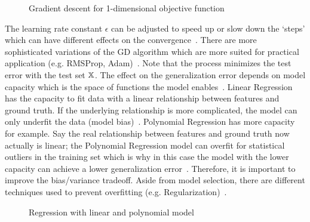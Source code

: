\begin{figure}
    \centering
    
    \caption{Gradient descent for 1-dimensional objective
        function~\citep{goodfellow_deep_2016}\label{fig:grad-desc}}
\end{figure}
The learning rate constant $\epsilon$ can be adjusted to speed up or slow down the `steps' which
can have different effects on the convergence~\citep{goodfellow_deep_2016}.
There are more sophisticated variations of the \ac{GD} algorithm which are more suited for practical
application (e.g. RMSProp, Adam)~\citep{geron_hands-machine_2017}.
Note that the process minimizes the test error with the test set $\mathbb{X}$.
The effect on the generalization error depends on model capacity which is the space of functions
the model enables~\citep{goodfellow_deep_2016}.
Linear Regression has the capacity to fit data with a linear relationship between features and
ground truth.
If the underlying relationship is more complicated, the model can only underfit the data (model
bias)~\citep{goodfellow_deep_2016}.
Polynomial Regression has more capacity for example.
Say the real relationship between features and ground truth now actually is linear;
the Polynomial Regression model can overfit for statistical outliers in the training set which is why
in this case the model with the lower capacity can achieve a lower generalization
error~\citep{geron_hands-machine_2017}.
Therefore, it is important to improve the bias/variance tradeoff.
Aside from model selection, there are different techniques used to prevent overfitting (e.g.
Regularization)~\citep{goodfellow_deep_2016}.
\begin{figure}[h]
    \centering
    \caption{Regression with linear and polynomial model\label{fig:examples}}
\end{figure}

